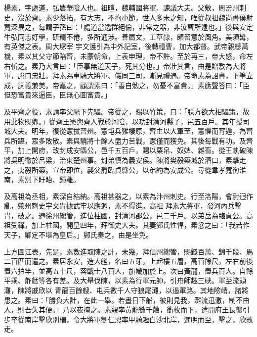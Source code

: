 
\begin{pinyinscope}

 楊素，字處道，弘農華陰人也。祖暄，魏輔國將軍、諫議大夫。父敷，周汾州刺史，沒於齊。素少落拓，有大志，不拘小節，世人多未之知，唯從叔祖魏尚書僕射寬深異之，每謂子孫曰：「處道當逸群絕倫，非常之器，非汝曹所逮也。」後與安定牛弘同志好學，研精不倦，多所通涉。善屬文，工草隸，頗留意於風角。美須髯，有英傑之表。周大塚宰
 宇文護引為中外記室，後轉禮曹，加大都督。武帝親總萬機，素以其父守節陷齊，未蒙朝命，上表申理，帝不許。至於再三，帝大怒，命左右斬之。素乃大言曰：「臣事無道天子，死其分也。」帝壯其言，由是贈敷為大將軍，謚曰忠壯。拜素為車騎大將軍、儀同三司，漸見禮遇。帝命素為詔書，下筆立成，詞義兼美。帝嘉之，顧謂素曰：「善自勉之，勿憂不富貴。」素應聲答曰：「臣但恐富貴來逼臣，臣無心圖富貴。」



 及平齊之役，素請率父麾下先驅。帝從之，賜以竹策，曰：「朕方欲大相驅策，故用此物賜卿。」從齊王憲與齊人戰於河陰，以功封清河縣子，邑五百戶。其年授司
 城大夫。明年，復從憲拔晉州。憲屯兵雞棲原，齊主以大軍至，憲懼而宵遁，為齊兵所躡，眾多敗散。素與驍將十餘人盡力苦戰，憲僅而獲免。其後每戰有功。及齊平，加上開府，改封成安縣公，邑千五百戶，賜以粟帛、奴婢、雜畜。從王軌破陳將吳明徹於呂梁，治東楚州事。封弟慎為義安侯。陳將樊毅築城於泗口，素擊走之，夷毅所築。宣帝即位，襲父爵臨貞縣公，以弟約為安成公。尋從韋孝寬徇淮南，素別下盱眙、鐘離。



 及高祖為丞相，素深自結納。高祖甚器之，以素為汴州刺史。行至洛陽，會尉迥作亂，滎州刺史宇文胄據武牢以應迥，素不得進。高祖
 拜素大將軍，發河內兵擊胄，破之。遷徐州總管，進位柱國，封清河郡公，邑二千戶。以弟岳為臨貞公。高祖受禪，加上柱國。開皇四年，拜御史大夫。其妻鄭氏性悍，素忿之曰：「我若作天子，卿定不堪為皇后。」鄭氏奏之，由是坐免。



 上方圖江表，先是，素數進取陳之計，未幾，拜信州總管，賜錢百萬、錦千段、馬二百匹而遣之。素居永安，造大艦，名曰五牙，上起樓五層，高百餘尺，左右前後置六拍竿，並高五十尺，容戰士八百人，旗幟加於上。次曰黃龍，置兵百人。自餘平乘、舴艋等各有差。及大舉伐陳，以素為行軍元帥，引舟師趣三硤。軍至流頭灘，陳將戚欣以
 青龍百餘艘、屯兵數千人守狼尾灘，以遏軍路。其地險峭，諸將患之。素曰：「勝負大計，在此一舉。若晝日下船，彼則見我，灘流迅激，制不由人，則吾失其便。」乃以夜掩之。素親率黃龍數千艘，銜枚而下，遣開府王長襲引步卒從南岸擊欣別柵，令大將軍劉仁恩率甲騎趣白沙北岸，遲明而至，擊之，欣敗走。




\end{pinyinscope}
